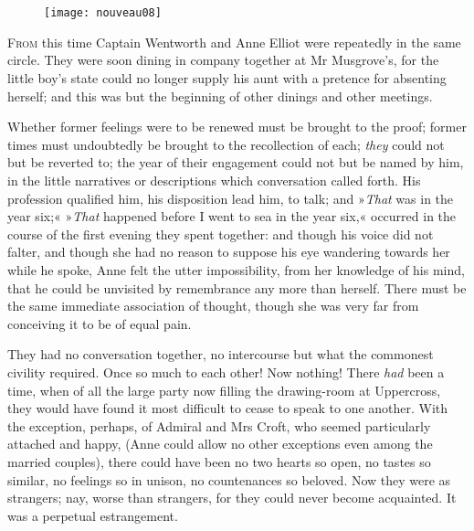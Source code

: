 \chapter[Chapter \thechapter]{}

\begin{figure}[t!]
\centering
\texttt{[image: nouveau08]}
\end{figure}

\lettrine[lines=4,lraise=0.3]{F}{rom} this time Captain Wentworth and Anne Elliot were repeatedly in the same circle. They were soon dining in company together at Mr Musgrove's, for the little boy's state could no longer supply his aunt with a pretence for absenting herself; and this was but the beginning of other dinings and other meetings.

Whether former feelings were to be renewed must be brought to the proof; former times must undoubtedly be brought to the recollection of each; \textit{they} could not but be reverted to; the year of their engagement could not but be named by him, in the little narratives or descriptions which conversation called forth. His profession qualified him, his disposition lead him, to talk; and »\textit{That} was in the year six;« »\textit{That} happened before I went to sea in the year six,« occurred in the course of the first evening they spent together: and though his voice did not falter, and though she had no reason to suppose his eye wandering towards her while he spoke, Anne felt the utter impossibility, from her knowledge of his mind, that he could be unvisited by remembrance any more than herself. There must be the same immediate association of thought, though she was very far from conceiving it to be of equal pain.

They had no conversation together, no intercourse but what the commonest civility required. Once so much to each other! Now nothing! There \textit{had} been a time, when of all the large party now filling the drawing-room at Uppercross, they would have found it most difficult to cease to speak to one another. With the exception, perhaps, of Admiral and Mrs Croft, who seemed particularly attached and happy, (Anne could allow no other exceptions even among the married couples), there could have been no two hearts so open, no tastes so similar, no feelings so in unison, no countenances so beloved. Now they were as strangers; nay, worse than strangers, for they could never become acquainted. It was a perpetual estrangement.

